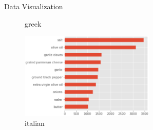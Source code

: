 \documentclass[
 size=14pt,
 paper=smartboard,  %
 mode=present, 		%
 display=slides, 	%
 style=tuliplab,  	%
 pauseslide,
 fleqn,leqno]{powerdot}
\begin{document}
\begin{slide}{Data  Visualization}
\begin{center}
{\begin{figure}
\begin{minipage}[t]{0.45\textwidth}
        \caption{greek}
        \end{minipage}
        \begin{minipage}[t]{0.45\textwidth}
        \centering
        \includegraphics[width=0.57\textwidth]{pic01/italian.eps}
        \caption{italian}
        \end{minipage}
      \end{figure}   
        
    }
    \end{center}
  
    \bigskip
    \begin{center}
    
    \end{center}
  \bigskip

\end{slide}
\end{document}
